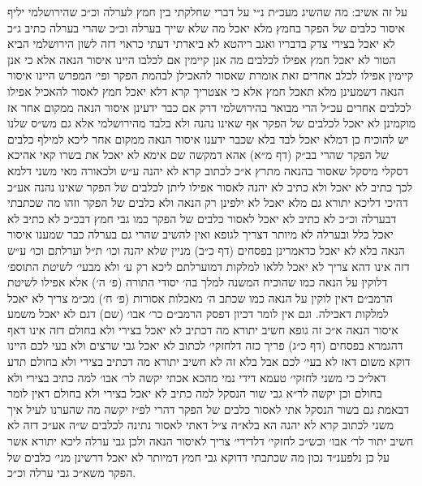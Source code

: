 \documentclass[12pt, openany]{book}
\begin{document}
\begin{multicols}{2}
על זה אשיב: מה שהשיג מעכ״ת נ״י על דברי שחלקתי בין חמץ לערלה וכ״כ שהירושלמי יליף איסור כלבים של הפקר בחמץ מלא יאכל מה שלא שייך בערלה וכ״כ שהרי בערלה כתיב ג״כ לא יאכל בצירי צדק בדבריו ואגב ריהטא לא ביארתי דעתי כראוי דזה לשון הירושלמי הביא הטור לא יאכל חמץ אפילו לכלבים מה אנן קיימין אם לכלבו היינו איסור הנאה אלא כי אנן קיימין אפילו לכלב אחרים זאת אומרת שאסור להאכילן לבהמת הפקר ופי׳ המפרש היינו איסור הנאה דשמעינן מלא תאכל חמץ אלא כי אצטריך קרא דלא יאכל חמץ לאסור להאכיל אפילו לכלבים אחרים עכ״ל הרי מבואר בהירושלמי דרק אם כבר ידעינן איסור הנאה ממקום אחר אז מוקמינן לא יאכל לכלבים של הפקר אף שאינו נהנה ולא בלבד מהירושלמי אלא גם מש״ס שלנו יש להוכיח כן דמלא יאכל לבד בלא שכבר ידענו איסור הנאה ממקום אחר ליכא למילף כלבים של הפקר שהרי בב״ק (דף מ״א) אהא דמקשה שם אימא לא יאכל את בשרו קאי אהיכא דסקלי מיסקל שאסור בהנאה מתרץ א״כ לכתוב קרא לא יהנה ע״ש ולכאורה מאי משני דלמא לכך כתיב לא יאכל ולא כתיב לא יהנה לאסור אפילו ליתן לכלבים של הפקר שאינו נהנה אע״כ דהיכי דליכא יתורא גם מלא יאכל לא ילפינן רק הנאה ולא כלבים של הפקר וזהו מה שכתבתי דבערלה וכ״כ לא כתיב לא יאכל לאסור כלבים של הפקר כמו גבי חמץ דבכ״כ לא כתיב לא יאכל כלל ובערלה לא מיותר דצריך לגופא ואין להשיב שהרי גם בערלה כבר שמענו איסור הנאה בלא לא יאכל כדאמרינן בפסחים (דף כ״ב) מניין שלא יהנה וכו׳ ת״ל וערלתם וכו׳ ע״ש דזה אינו דהא צריך לא יאכל ללאו למלקות דמוערלתם ליכא רק ע׳ ולא מבעי׳ לשיטת התוספ׳ דלוקין על הנאה כמו שהוכיח המשנה למלך בה׳ יסודי התורה (פ׳ ה׳) אלא אפילו לשיטת הרמב״ם דאין לוקין על הנאה כמו שכתב ה׳ מאכלות אסורות (פ׳ ח׳) מכ״מ צריך לא יאכל למלקות דאכילה. וגם אין לומר דכיון דפסק הרמב״ם כר׳ אבו׳ (שם) דגם לא יאכל משמע איסור הנאה א״כ זה גופא חשיב יתורא מה דכתיב לא יאכל בצירי ולא בחולם דזה אינו דאף דהגמרא בפסחים (דף כ״ג) פריך כזה דלחזקי׳ לכתוב לא יאכל גבי שרצים ולא בעי לכם היינו דוקא משום דאז לא בעי׳ לכם אבל בלא זה לא חשיב יתורא מה דכתיב בצירי ולא בחולם תדע דאל״כ כי משני לחזקי׳ טעמא דידי נמי מהכא אכתי יקשה לר׳ אבו׳ למה כתיב בצירי ולא בחולם וכן יקשה לר״א גבי שור הנסקל למה כתיב לא יאכל בצירי ולא בחולם דאין לומר דבאמת גם בשור הנסקל אתי לאסור כלבים של הפקר דהרי לפ״ז יקשה מה שהערנו לעיל איך משני לכתוב קרא לא יהנה הא בלא״ה צ״ל דאתי לאסור נתינה לכלבים ש״ה אע״כ דזה לא חשיב יתור לר׳ אבו׳ וכש״כ לחזקי׳ דלדידי׳ צריך לאיסור הנאה ולכן גבי ערלה ליכא יתורא אשר על כן נלפענ״ד נכון מה שכתבתי דדוקא גבי חמץ דמיותר לא יאכל דרשינן מני׳ כלבים של הפקר משא״כ גבי ערלה וכ״כ.\\\vspace{0pt}


\end{multicols}
\end{document}
